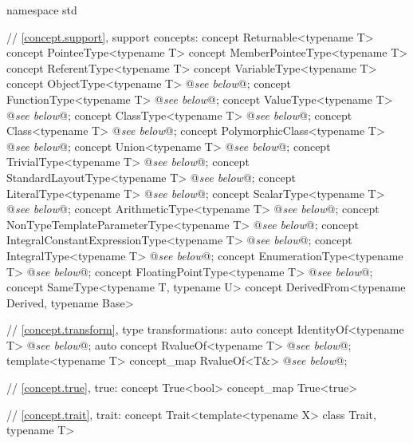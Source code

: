 \documentclass[american,twoside]{book}
\begin{document}
\begin{codeblock}
namespace std {
  // \ref{concept.support}, support concepts:
  concept Returnable<typename T> { }
  concept PointeeType<typename T> { }
  concept MemberPointeeType<typename T> { }
  concept ReferentType<typename T> { }
  concept VariableType<typename T> { }
  concept ObjectType<typename T> @\textit{see below}@;
  concept FunctionType<typename T> @\textit{see below}@;
  concept ValueType<typename T> @\textit{see below}@;
  concept ClassType<typename T> @\textit{see below}@;
  concept Class<typename T> @\textit{see below}@;
  concept PolymorphicClass<typename T> @\textit{see below}@;
  concept Union<typename T> @\textit{see below}@;
  concept TrivialType<typename T> @\textit{see below}@;
  concept StandardLayoutType<typename T> @\textit{see below}@;
  concept LiteralType<typename T> @\textit{see below}@;
  concept ScalarType<typename T> @\textit{see below}@;
  concept ArithmeticType<typename T> @\textit{see below}@;
  concept NonTypeTemplateParameterType<typename T> @\textit{see below}@;
  concept IntegralConstantExpressionType<typename T> @\textit{see below}@;
  concept IntegralType<typename T> @\textit{see below}@;
  concept EnumerationType<typename T> @\textit{see below}@;
  concept FloatingPointType<typename T> @\textit{see below}@;
  concept SameType<typename T, typename U> {  }
  concept DerivedFrom<typename Derived, typename Base> { }

  // \ref{concept.transform}, type transformations:
  auto concept IdentityOf<typename T> @\textit{see below}@;
  auto concept RvalueOf<typename T> @\textit{see below}@;
  template<typename T> concept_map RvalueOf<T&> @\textit{see below}@;

  // \ref{concept.true}, true:
  concept True<bool> { }
  concept_map True<true> { }

  // \ref{concept.trait}, trait:
  concept Trait<template<typename X> class Trait, typename T> {}


}
\end{codeblock}
\end{document}
